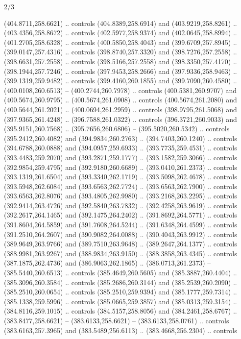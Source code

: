 \begin{flagdescription}{2/3}
\begin{scope}[xshift=0.5\flaglength,yshift=0.5\flagwidth,scale=\flagwidth/495.65]
\begin{scope}[y=0.8pt, x=0.8pt, yscale=-1,shift={(-463.76,-309.78)}]
  (404.8711,258.6621) .. controls (404.8389,258.6914) and (403.9219,258.8261) ..
  (403.4356,258.8672) .. controls (402.5977,258.9374) and (402.0645,258.8994) ..
  (401.2705,258.6328) .. controls (400.5850,258.4043) and (399.6709,257.8945) ..
  (399.0147,257.4316) .. controls (398.8740,257.3320) and (398.7276,257.2558) ..
  (398.6631,257.2558) .. controls (398.5166,257.2558) and (398.3350,257.4170) ..
  (398.1944,257.7246) .. controls (397.9453,258.2666) and (397.9336,258.9463) ..
  (399.1319,259.9482) .. controls (399.4160,260.1855) and (399.7090,260.4580) ..
  (400.0108,260.6513) -- (400.2744,260.7978) .. controls (400.5381,260.9707) and
  (400.5674,260.9795) .. (400.5674,261.0908) .. controls (400.5674,261.2080) and
  (400.5644,261.2021) .. (400.0694,261.2959) .. controls (398.9795,261.5068) and
  (397.9365,261.4248) .. (396.7588,261.0322) .. controls (396.3721,260.9033) and
  (395.9151,260.7568) .. (395.7656,260.6806) -- (395.5020,260.5342) .. controls
  (395.2412,260.4082) and (394.9834,260.2763) .. (394.7403,260.1240) .. controls
  (394.6788,260.0888) and (394.0957,259.6933) .. (393.7735,259.4531) .. controls
  (393.4483,259.2070) and (393.2871,259.1777) .. (393.1582,259.3066) .. controls
  (392.9854,259.4795) and (392.9180,260.6689) .. (393.0410,261.2373) .. controls
  (393.1319,261.6504) and (393.3340,262.1719) .. (393.5098,262.4678) .. controls
  (393.5948,262.6084) and (393.6563,262.7724) .. (393.6563,262.7900) .. controls
  (393.6563,262.8076) and (393.4805,262.9980) .. (393.2168,263.2295) .. controls
  (392.9414,263.4726) and (392.5840,263.7832) .. (392.4258,263.9619) .. controls
  (392.2617,264.1465) and (392.1475,264.2402) .. (391.8692,264.5771) .. controls
  (391.8604,264.5859) and (391.7608,264.5244) .. (391.6348,264.4599) .. controls
  (391.2510,264.2607) and (390.9082,264.0088) .. (390.4043,263.9912) .. controls
  (389.9649,263.9766) and (389.7510,263.9648) .. (389.2647,264.1377) .. controls
  (388.9981,263.9267) and (388.9834,263.9150) .. (388.3858,263.4345) .. controls
  (387.1875,262.4736) and (386.9063,262.1865) .. (386.0713,261.2373) --
  (385.5440,260.6513) .. controls (385.4649,260.5605) and (385.3887,260.4404) ..
  (385.3096,260.3584) .. controls (385.2686,260.3144) and (385.2539,260.2090) ..
  (385.2510,260.0654) .. controls (385.2510,259.9394) and (385.1777,259.7314) ..
  (385.1338,259.5996) .. controls (385.0665,259.3857) and (385.0313,259.3154) ..
  (384.8116,259.1015) .. controls (384.5157,258.8056) and (384.2461,258.6767) ..
  (383.8477,258.6621) -- (383.6133,258.6621) -- (383.6133,258.0761) .. controls
  (383.6163,257.3965) and (383.5489,256.6113) .. (383.4668,256.2304) .. controls

\end{scope}
\end{scope}
\end{flagdescription}

